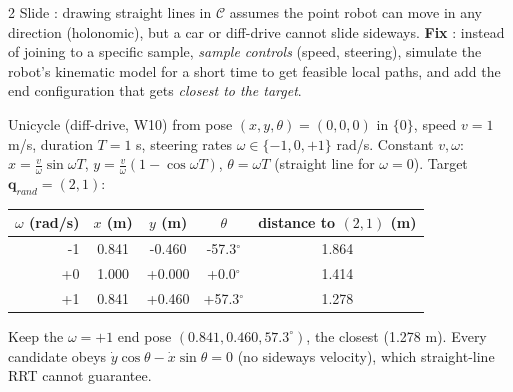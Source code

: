 \begin{multicols}{2}
\label{w12:nh}
Slide : drawing straight lines in $\mathcal C$ assumes the point robot can move in any direction (holonomic), but a car or diff-drive cannot slide sideways. \textbf{Fix} : instead of joining to a specific sample, \emph{sample controls} (speed, steering), simulate the robot's kinematic model for a short time to get feasible local paths, and add the end configuration that gets \emph{closest to the target}.
\begin{worked}
Unicycle (diff-drive, W10) from pose $(x,y,\theta)=(0,0,0)$ in $\{0\}$, speed $v=1$ m/s, duration $T=1$ s, steering rates $\omega\in\{-1,0,+1\}$ rad/s. Constant $v,\omega$: $x=\tfrac v\omega\sin\omega T$, $y=\tfrac v\omega(1-\cos\omega T)$, $\theta=\omega T$ (straight line for $\omega=0$). Target $\mathbf q_{rand}=(2,1)$:\par\vspace{1pt}
\small\setlength{\tabcolsep}{4pt}
\begin{tabular}{@{}rcccc@{}}\toprule
$\omega$ (rad/s) & $x$ (m) & $y$ (m) & $\theta$ & distance to $(2,1)$ (m)\\\midrule
-1 & 0.841 & -0.460 & -57.3$^\circ$ & 1.864\\
+0 & 1.000 & +0.000 & +0.0$^\circ$ & 1.414\\
+1 & 0.841 & +0.460 & +57.3$^\circ$ & 1.278\\
\bottomrule\end{tabular}\par\vspace{2pt}
Keep the $\omega=+1$ end pose $(0.841,0.460,57.3^\circ)$, the closest (1.278 m). Every candidate obeys $\dot y\cos\theta-\dot x\sin\theta=0$ (no sideways velocity), which straight-line RRT cannot guarantee. \chk
\end{worked}


\end{multicols}

